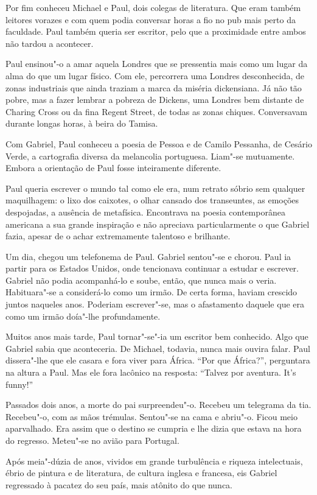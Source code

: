 Por fim conheceu Michael e Paul, dois colegas de literatura. Que eram
também leitores vorazes e com quem podia conversar horas a fio no pub
mais perto da faculdade. Paul também queria ser escritor, pelo que a
proximidade entre ambos não tardou a acontecer.

Paul ensinou"-o a amar aquela Londres que se pressentia mais como um
lugar da alma do que um lugar físico. Com ele, percorrera uma Londres
desconhecida, de zonas industriais que ainda traziam a marca da miséria
dickensiana. Já não tão pobre, mas a fazer lembrar a pobreza de Dickens,
uma Londres bem distante de Charing Cross ou da fina Regent Street, de
todas as zonas chiques. Conversavam durante longas horas, à beira do
Tamisa.

Com Gabriel, Paul conheceu a poesia de Pessoa e de Camilo Pessanha, de
Cesário Verde, a cartografia diversa da melancolia portuguesa. Liam"-se
mutuamente. Embora a orientação de Paul fosse inteiramente diferente.

Paul queria escrever o mundo tal como ele era, num retrato sóbrio sem
qualquer maquilhagem: o lixo dos caixotes, o olhar cansado dos
transeuntes, as emoções despojadas, a ausência de metafísica. Encontrava
na poesia contemporânea americana a sua grande inspiração e não
apreciava particularmente o que Gabriel fazia, apesar de o achar
extremamente talentoso e brilhante.

Um dia, chegou um telefonema de Paul. Gabriel sentou"-se e chorou. Paul
ia partir para os Estados Unidos, onde tencionava continuar a estudar e
escrever. Gabriel não podia acompanhá-lo e soube, então, que nunca mais
o veria. Habituara"-se a considerá-lo como um irmão. De certa forma,
haviam crescido juntos naqueles anos. Poderiam escrever"-se, mas o
afastamento daquele que era como um irmão doía"-lhe profundamente.

Muitos anos mais tarde, Paul tornar"-se"-ia um escritor bem conhecido.
Algo que Gabriel sabia que aconteceria. De Michael, todavia, nunca mais
ouvira falar. Paul dissera"-lhe que ele casara e fora viver para África.
``Por que África?'', perguntara na altura a Paul. Mas ele fora lacônico na
resposta: ``Talvez por aventura. It's funny!''

Passados dois anos, a morte do pai surpreendeu"-o. Recebeu um telegrama
da tia. Recebeu"-o, com as mãos trémulas. Sentou"-se na cama e abriu"-o.
Ficou meio aparvalhado. Era assim que o destino se cumpria e lhe dizia
que estava na hora do regresso. Meteu"-se no avião para Portugal.

Após meia"-dúzia de anos, vividos em grande turbulência e riqueza
intelectuais, ébrio de pintura e de literatura, de cultura inglesa e
francesa, eis Gabriel regressado à pacatez do seu país, mais atônito do
que nunca.

